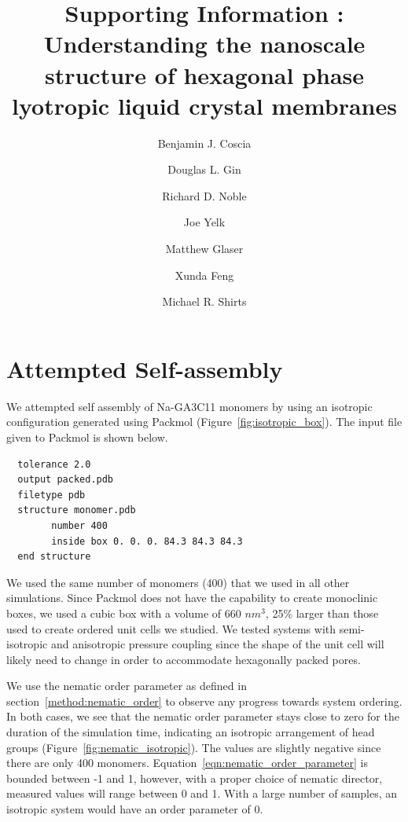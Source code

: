 \documentclass[journal=jpcbfk,manusciprt=article]{achemso}
\title{Supporting Information : Understanding the nanoscale structure of hexagonal phase lyotropic liquid crystal membranes}
\author{Benjamin J. Coscia \and Douglas L. Gin \and Richard D. Noble \and Joe Yelk \and Matthew Glaser \and Xunda Feng \and Michael R. Shirts}
\begin{document}
%  
  \graphicspath{{./figures/}}  %
  \maketitle

  \section{Attempted Self-assembly}\label{section:self_assembly}
  
  We attempted self assembly of Na-GA3C11 monomers by using an isotropic configuration
  generated using Packmol \cite{martinez_packmol:_2009} (Figure~\ref{fig:isotropic_box}).
  The input file given to Packmol is shown below.
  
  \lstset{language=bash}
  \begin{lstlisting}
  tolerance 2.0
  output packed.pdb
  filetype pdb
  structure monomer.pdb
  		number 400
  		inside box 0. 0. 0. 84.3 84.3 84.3
  end structure
  \end{lstlisting}

  We used the same number of monomers (400) that we used in all other simulations. 
  Since Packmol does not have the capability to create monoclinic boxes, we used a cubic
  box with a volume of 660 $nm^3$, 25\% larger than those used to create ordered unit
  cells we studied. We tested systems with semi-isotropic and anisotropic pressure 
  coupling since the shape of the unit cell will likely need to change in order to 
  accommodate hexagonally packed pores.
  
  We use the nematic order parameter as defined in section~\ref{method:nematic_order} to 
  observe any progress towards system ordering. In both cases, we see that the nematic
  order parameter stays close to zero for the duration of the simulation time, indicating
  an isotropic arrangement of head groups (Figure~\ref{fig:nematic_isotropic}). The values
  are slightly negative since there are only 400 monomers. 
  Equation~\ref{eqn:nematic_order_parameter} is bounded between -1 and 1, however, with a
  proper choice of nematic director, measured values will range between 0 and 1. With a 
  large number of samples, an isotropic system would have an order parameter of 0.
  
\end{document}
